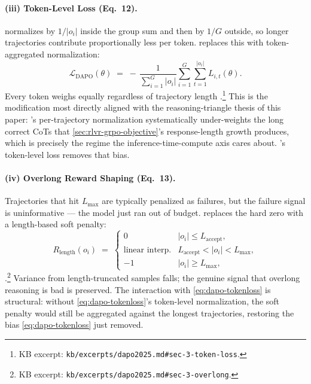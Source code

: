 \paragraph{(iii) Token-Level Loss (Eq.\ 12).}  normalizes by
$1/|o_i|$ inside the group sum and then by $1/G$ outside, so longer
trajectories contribute proportionally less per token.  replaces
this with token-aggregated normalization:
\begin{equation}
\mathcal{L}_{\mathrm{DAPO}}(\theta) \;=\; -\,\frac{1}{\sum_{i=1}^{G} |o_i|} \sum_{i=1}^{G} \sum_{t=1}^{|o_i|} L_{i,t}(\theta).
\label{eq:dapo-tokenloss}
\end{equation}
Every token weighs equally regardless of trajectory length
\citep[Eq.\ 12]{dapo2025}.\footnote{KB excerpt:
\texttt{kb/excerpts/dapo2025.md\#sec-3-token-loss}.} This is the
modification most directly aligned with the reasoning-triangle thesis
of this paper: 's per-trajectory normalization systematically
under-weights the long correct CoTs that
\cref{sec:rlvr-grpo-objective}'s response-length growth produces, which
is precisely the regime the inference-time-compute axis cares about.
's token-level loss removes that bias.

\paragraph{(iv) Overlong Reward Shaping (Eq.\ 13).} Trajectories that
hit $L_\mathrm{max}$ are typically penalized as failures, but the
failure signal is uninformative --- the model just ran out of budget.
 replaces the hard zero with a length-based soft penalty:
\begin{equation}
R_{\mathrm{length}}(o_i) \;=\; \begin{cases}
0 & |o_i| \le L_{\mathrm{accept}}, \\
\text{linear interp.} & L_{\mathrm{accept}} < |o_i| < L_\mathrm{max}, \\
-1 & |o_i| \ge L_\mathrm{max},
\end{cases}
\label{eq:dapo-overlong}
\end{equation}
\citep[Eq.\ 13]{dapo2025}.\footnote{KB excerpt:
\texttt{kb/excerpts/dapo2025.md\#sec-3-overlong}.} Variance from
length-truncated samples falls; the genuine signal that overlong
reasoning is bad is preserved. The interaction with
\cref{eq:dapo-tokenloss} is structural: without
\cref{eq:dapo-tokenloss}'s token-level normalization, the soft penalty
would still be aggregated against the longest trajectories, restoring
the bias \cref{eq:dapo-tokenloss} just removed.

